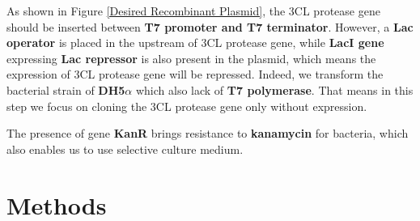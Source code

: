 \documentclass{article}
\begin{document}
    As shown in Figure \ref{Desired Recombinant Plasmid}, the 3CL protease gene should be inserted between \textbf{T7 promoter and T7 terminator}.
    However, a \textbf{Lac operator}\cite{TheCell} is placed in the upstream of 3CL protease gene, while \textbf{LacI gene} expressing \textbf{Lac repressor} is also present in the plasmid, which means the expression of 3CL protease gene will be repressed.
    Indeed, we transform the bacterial strain of \textbf{DH5$\alpha$} which also lack of \textbf{T7 polymerase}.
    That means in this step we focus on cloning the 3CL protease gene only without expression.

    The presence of gene \textbf{KanR} brings resistance to \textbf{kanamycin} for bacteria, which also enables us to use selective culture medium. 
\section{Methods}
\end{document}

